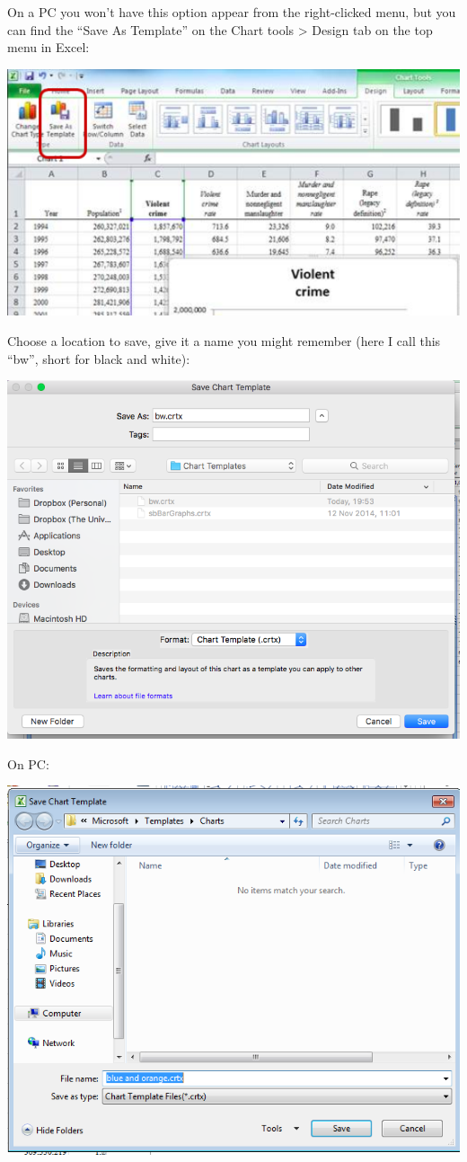 \documentclass[
]{book}
\begin{document}
On a PC you won't have this option appear from the right-clicked menu, but you can find the ``Save As Template'' on the Chart tools \textgreater{} Design tab on the top menu in Excel:

\includegraphics{imgs/pc_save_template.png}

Choose a location to save, give it a name you might remember (here I call this ``bw'', short for black and white):

\includegraphics{imgs/name_template.png}

On PC:

\includegraphics{imgs/pc_save_template_3.png}
\end{document}
